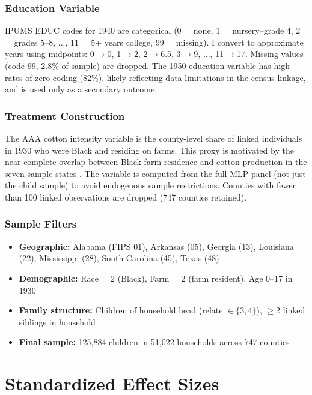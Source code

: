 \documentclass[12pt]{article}
\begin{document}
\subsubsection*{Education Variable} IPUMS EDUC codes for 1940 are categorical (0 = none, 1 = nursery--grade 4, 2 = grades 5--8, ..., 11 = 5+ years college, 99 = missing). I convert to approximate years using midpoints: 0$\to$0, 1$\to$2, 2$\to$6.5, 3$\to$9, ..., 11$\to$17. Missing values (code 99, 2.8\% of sample) are dropped. The 1950 education variable has high rates of zero coding (82\%), likely reflecting data limitations in the census linkage, and is used only as a secondary outcome.

\subsubsection*{Treatment Construction} The AAA cotton intensity variable is the county-level share of linked individuals in 1930 who were Black and residing on farms. This proxy is motivated by the near-complete overlap between Black farm residence and cotton production in the seven sample states \citep{wright1986old}. The variable is computed from the full MLP panel (not just the child sample) to avoid endogenous sample restrictions. Counties with fewer than 100 linked observations are dropped (747 counties retained).

\subsubsection*{Sample Filters}
\begin{itemize}
\item \textbf{Geographic:} Alabama (FIPS 01), Arkansas (05), Georgia (13), Louisiana (22), Mississippi (28), South Carolina (45), Texas (48)
\item \textbf{Demographic:} Race = 2 (Black), Farm = 2 (farm resident), Age 0--17 in 1930
\item \textbf{Family structure:} Children of household head (relate $\in \{3,4\}$), $\geq$2 linked siblings in household
\item \textbf{Final sample:} 125,884 children in 51,022 households across 747 counties
\end{itemize}

\section{Standardized Effect Sizes}
\label{sec:sde}


\end{document}
